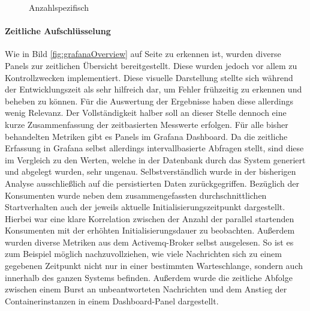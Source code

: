 \begin{figure}[ht!]
  \centering
  \label{fig:specContainers}
  \caption[Startzeit Container - Anzahl spezifisch]{Anzahlspezifisch}
\end{figure}


\paragraph{Zeitliche Aufschlüsselung}
Wie in Bild \ref{fig:grafanaOverview} auf Seite \pageref{fig:grafanaOverview} zu erkennen ist, wurden diverse Panels zur zeitlichen Übersicht bereitgestellt. Diese wurden jedoch vor allem zu Kontrollzwecken implementiert. Diese visuelle Darstellung stellte sich während der Entwicklungszeit als sehr hilfreich dar, um Fehler frühzeitig zu erkennen und beheben zu können. Für die Auswertung der Ergebnisse haben diese allerdings wenig Relevanz. Der Vollständigkeit halber soll an dieser Stelle dennoch eine kurze Zusammenfassung der zeitbasierten Messwerte erfolgen. Für alle bisher behandelten Metriken gibt es Panels im Grafana Dashboard. Da die zeitliche Erfassung in Grafana selbst allerdings intervallbasierte Abfragen stellt, sind diese im Vergleich zu den Werten, welche in der Datenbank durch das System generiert und abgelegt wurden, sehr ungenau. Selbstverständlich wurde in der bisherigen Analyse ausschließlich auf die persistierten Daten zurückgegriffen. Bezüglich der Konsumenten wurde neben dem zusammengefassten durchschnittlichen Startverhalten auch der jeweils aktuelle Initialisierungszeitpunkt dargestellt. Hierbei war eine klare Korrelation zwischen der Anzahl der parallel startenden Konsumenten mit der erhöhten Initialisierungsdauer zu beobachten. Außerdem wurden diverse Metriken aus dem Activemq-Broker selbst ausgelesen. So ist es zum Beispiel möglich nachzuvollziehen, wie viele Nachrichten sich zu einem gegebenen Zeitpunkt nicht nur in einer bestimmten Warteschlange, sondern auch innerhalb des ganzen Systems befinden. Außerdem wurde die zeitliche Abfolge zwischen einem Burst an unbeantworteten Nachrichten und dem Anstieg der Containerinstanzen in einem Dashboard-Panel dargestellt.

